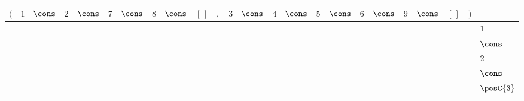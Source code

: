 {\scriptsize\setlength{\tabcolsep}{1.5pt}%
\begin{tabular}{ccccccccccccccccccccccc|l}
$($ & $1$ & $\cons$ & $2$ & $\cons$ & \cellcolor{blue!25}$7$ & $\cons$ & $8$ & $\cons$ & $[\,]$ & $,$ & $3$ & $\cons$ & $4$ & $\cons$ & $5$ & $\cons$ & $6$ & $\cons$ & $9$ & $\cons$ & $[\,]$ & $)$ & \\ \hline
\gcell{$$} & \gcell{$\posD{\bullet}$} & \gcell{$\posC{\circ}$} & \gcell{$$} & \gcell{$$} & \cellcolor{blue!10}\gcell{$$} & \gcell{$$} & \gcell{$$} & \gcell{$$} & \gcell{$$} & \gcell{$\posC{\circ}$} & \gcell{$\posC{\circ}$} & \gcell{$\posC{\circ}$} & \gcell{$$} & \gcell{$$} & \gcell{$$} & \gcell{$$} & \gcell{$$} & \gcell{$$} & \gcell{$$} & \gcell{$$} & \gcell{$$} & \gcell{$$} & $1$ \\
\gcell{$$} & \gcell{$\posC{\circ}$} & \gcell{$\posC{\circ}$} & \gcell{$$} & \gcell{$$} & \cellcolor{blue!10}\gcell{$$} & \gcell{$$} & \gcell{$$} & \gcell{$$} & \gcell{$$} & \gcell{$\posC{\circ}$} & \gcell{$\posC{\circ}$} & \gcell{$\posC{\circ}$} & \gcell{$$} & \gcell{$$} & \gcell{$$} & \gcell{$$} & \gcell{$$} & \gcell{$$} & \gcell{$$} & \gcell{$$} & \gcell{$$} & \gcell{$$} & $\cons$ \\
\gcell{$$} & \gcell{$\posC{\circ}$} & \gcell{$\posC{\circ}$} & \gcell{$\posD{\bullet}$} & \gcell{$\posC{\circ}$} & \cellcolor{blue!10}\gcell{$$} & \gcell{$$} & \gcell{$$} & \gcell{$$} & \gcell{$$} & \gcell{$\posC{\circ}$} & \gcell{$\posC{\circ}$} & \gcell{$\posC{\circ}$} & \gcell{$$} & \gcell{$$} & \gcell{$$} & \gcell{$$} & \gcell{$$} & \gcell{$$} & \gcell{$$} & \gcell{$$} & \gcell{$$} & \gcell{$$} & $2$ \\
\gcell{$$} & \gcell{$\posC{\circ}$} & \gcell{$\posC{\circ}$} & \gcell{$\posC{\circ}$} & \gcell{$\posC{\circ}$} & \cellcolor{blue!10}\gcell{$$} & \gcell{$$} & \gcell{$$} & \gcell{$$} & \gcell{$$} & \gcell{$\posC{\circ}$} & \gcell{$\posC{\circ}$} & \gcell{$\posC{\circ}$} & \gcell{$$} & \gcell{$$} & \gcell{$$} & \gcell{$$} & \gcell{$$} & \gcell{$$} & \gcell{$$} & \gcell{$$} & \gcell{$$} & \gcell{$$} & $\cons$ \\
\gcell{$$} & \gcell{$\posC{\circ}$} & \gcell{$\posC{\circ}$} & \gcell{$\posC{\circ}$} & \gcell{$\posC{\circ}$} & \cellcolor{blue!10}\gcell{$\posC{\circ}$} & \gcell{$\posC{\circ}$} & \gcell{$$} & \gcell{$$} & \gcell{$$} & \gcell{$\posC{\circ}$} & \gcell{$\posD{\bullet}$} & \gcell{$\posC{\circ}$} & \gcell{$$} & \gcell{$$} & \gcell{$$} & \gcell{$$} & \gcell{$$} & \gcell{$$} & \gcell{$$} & \gcell{$$} & \gcell{$$} & \gcell{$$} & \cellcolor{blue!10}$\posC{3}$ \\

\end{tabular}}
